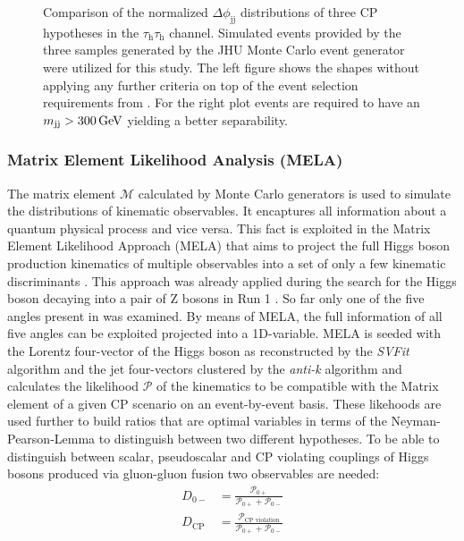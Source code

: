 \begin{figure}[h!]
\begin{subfigure}{.45\textwidth}
    \end{subfigure}
    \caption[\jdphi{} shape comparison.]{Comparison of the normalized $\Delta \phi_\text{jj}$ distributions of three CP hypotheses in the $\tau_\text{h}\tau_\text{h}$ channel.
    Simulated events provided by the three samples generated by the JHU \@{Monte Carlo} event generator were utilized for this study.
    The left figure shows the shapes without applying any further criteria on top of the event selection requirements from .
     For the right plot events are required to have an $m_\text{jj}>\text{300\,GeV}$ yielding a better separability.}\label{ES:jdphi_shapes}%
\end{figure}%

\subsubsection{Matrix Element Likelihood Analysis (MELA)}\label{sec:MELA}
The matrix element $\mathcal{M}$ calculated by Monte Carlo generators is used to simulate the distributions
of kinematic observables. It encaptures all information about a quantum physical process and vice versa.
This fact is exploited in the Matrix Element Likelihood Approach
(MELA) that aims to project the full Higgs boson production kinematics of multiple observables into a set of only a few kinematic discriminants \cite{constrainingHiggsAtProtonColliders,spin_determination,onthespin,constrainHiggsBosonCoupingsWithMET}. This approach was already applied during the search for the Higgs boson decaying into a pair of Z bosons in Run 1 \cite{Chatrchyan2012_hzz}.
So far only one of the five angles present in  was examined. By means of MELA, the full information of all five angles can be exploited projected into a 1D-variable.
MELA is seeded with the Lorentz four-vector of the Higgs boson as reconstructed by the \textit{SVFit} algorithm \cite{svfit} and the jet four-vectors clustered by the \textit{anti-k} algorithm and calculates the likelihood $\mathcal{P}$ of 
the kinematics to be compatible with the Matrix element of a given CP scenario on an event-by-event basis. These likehoods are used further to 
build ratios that are optimal variables in terms of the Neyman-Pearson-Lemma \cite{Neyman289} to distinguish between two different hypotheses.  
To be able to distinguish between scalar, pseudoscalar and CP violating couplings of Higgs bosons produced via gluon-gluon fusion two observables are needed: 
\begin{align}
    D_{0-} &= \frac{\mathcal{P}_{0+}}{\mathcal{P}_{0+} + \mathcal{P}_{0-}} \\
    D_\text{CP} &= \frac{\mathcal{P}_\text{CP violation}}{\mathcal{P}_{0+} + \mathcal{P}_{0-}} 
\end{align}
